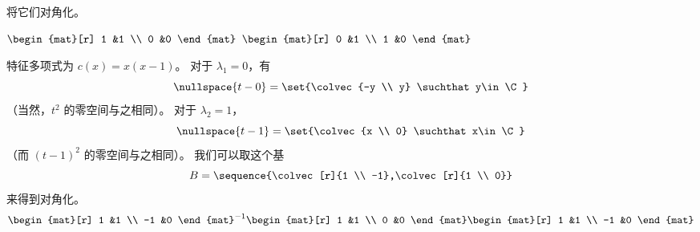\begin{exercises}
  \recommended \item 将它们对角化。
    \begin{exparts*}
       \partsitem \( \begin{mat}[r]
                  1  &1  \\
                  0  &0
                \end{mat}  \)
       \partsitem \( \begin{mat}[r]
                  0  &1  \\
                  1  &0
                \end{mat}  \)
    \end{exparts*}
    \begin{answer}
      \begin{exparts}
        \partsitem 特征多项式为 \( c(x)=x(x-1) \)。
          对于 $\lambda_1=0$，有
          \begin{equation*}
            \nullspace{t-0}=\set{\colvec{-y \\ y}
                                 \suchthat y\in\C }  
          \end{equation*} 
          （当然，$t^2$ 的零空间与之相同）。
          对于 $\lambda_2=1$，
          \begin{equation*}
            \nullspace{t-1}=\set{\colvec{x \\ 0}
                                     \suchthat x\in\C }  
          \end{equation*}
          （而 $(t-1)^2$ 的零空间与之相同）。
          我们可以取这个基
          \begin{equation*}
            B=\sequence{\colvec[r]{1 \\ -1},\colvec[r]{1 \\ 0}}
          \end{equation*}
          来得到对角化。
          \begin{equation*}
            \begin{mat}[r]
              1  &1  \\
             -1  &0
            \end{mat}^{-1}
            \begin{mat}[r]
              1  &1  \\
              0  &0
            \end{mat}
            \begin{mat}[r]
              1  &1  \\
             -1  &0
            \end{mat}

\end{equation*}
\end{exparts}
\end{answer}
\end{exercises}
